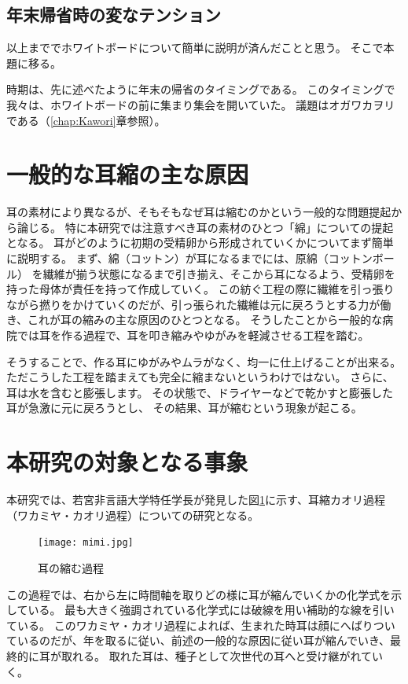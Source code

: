 \subsection{年末帰省時の変なテンション}
以上まででホワイトボードについて簡単に説明が済んだことと思う。
そこで本題に移る。
\par
時期は、先に述べたように年末の帰省のタイミングである。
このタイミングで我々は、ホワイトボードの前に集まり集会を開いていた。
議題はオガワカヲリである（\ref{chap:Kawori}章参照）。

\section{一般的な耳縮の主な原因}
耳の素材により異なるが、そもそもなぜ耳は縮むのかという一般的な問題提起から論じる。
特に本研究では注意すべき耳の素材のひとつ「綿」についての提起となる。
耳がどのように初期の受精卵から形成されていくかについてまず簡単に説明する。
まず、綿（コットン）が耳になるまでには、原綿（コットンボール） を繊維が揃う状態になるまで引き揃え、そこから耳になるよう、受精卵を持った母体が責任を持って作成していく。
この紡ぐ工程の際に繊維を引っ張りながら撚りをかけていくのだが、引っ張られた繊維は元に戻ろうとする力が働き、これが耳の縮みの主な原因のひとつとなる。
そうしたことから一般的な病院では耳を作る過程で、耳を叩き縮みやゆがみを軽減させる工程を踏む。\par

そうすることで、作る耳にゆがみやムラがなく、均一に仕上げることが出来る。
ただこうした工程を踏まえても完全に縮まないというわけではない。
さらに、耳は水を含むと膨張します。
その状態で、ドライヤーなどで乾かすと膨張した耳が急激に元に戻ろうとし、
その結果、耳が縮むという現象が起こる。

\section{本研究の対象となる事象}
本研究では、若宮非言語大学特任学長が発見した図\ref{mimi}に示す、耳縮カオリ過程（ワカミヤ・カオリ過程）についての研究となる。
\begin{figure}
\centering
\texttt{[image: mimi.jpg]}
\caption{耳の縮む過程}
\label{mimi}
\end{figure}
この過程では、右から左に時間軸を取りどの様に耳が縮んでいくかの化学式を示している。
最も大きく強調されている化学式には破線を用い補助的な線を引いている。
このワカミヤ・カオリ過程によれば、生まれた時耳は顔にへばりついているのだが、年を取るに従い、前述の一般的な原因に従い耳が縮んでいき、最終的に耳が取れる。
取れた耳は、種子として次世代の耳へと受け継がれていく。
